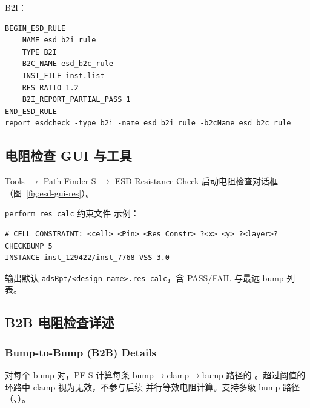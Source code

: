 B2I：
\begin{lstlisting}
BEGIN_ESD_RULE
    NAME esd_b2i_rule
    TYPE B2I
    B2C_NAME esd_b2c_rule
    INST_FILE inst.list
    RES_RATIO 1.2
    B2I_REPORT_PARTIAL_PASS 1
END_ESD_RULE
report esdcheck -type b2i -name esd_b2i_rule -b2cName esd_b2c_rule
\end{lstlisting}

\subsection{电阻检查 GUI 与工具}
Tools $\rightarrow$ Path Finder S $\rightarrow$ ESD Resistance Check 启动电阻检查对话框（图~\ref{fig:esd-gui-res}）。


\texttt{perform res\_calc} 约束文件  示例：
\begin{lstlisting}
# CELL CONSTRAINT: <cell> <Pin> <Res_Constr> ?<x> <y> ?<layer>?
CHECKBUMP 5
INSTANCE inst_129422/inst_7768 VSS 3.0
\end{lstlisting}
输出默认 \texttt{adsRpt/<design\_name>.res\_calc}，含 PASS/FAIL 与最远 bump 列表。

\subsection{B2B 电阻检查详述}
\subsubsection*{Bump-to-Bump (B2B) Details}

对每个 bump 对，PF-S 计算每条 bump$\rightarrow$clamp$\rightarrow$bump 路径的 。超过阈值的环路中 clamp 视为无效，不参与后续  并行等效电阻计算。支持多级 bump 路径（、）。

